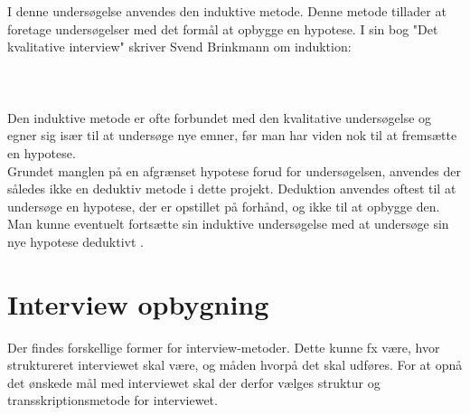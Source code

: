 \\\\ 
I denne undersøgelse anvendes den induktive metode. Denne metode tillader at foretage undersøgelser med det formål at opbygge en hypotese. 
I sin bog "Det kvalitative interview" skriver Svend Brinkmann om induktion:
\\\\
 \citep{brinkmann2014}
\\\\
Den induktive metode er ofte forbundet med den kvalitative undersøgelse og egner sig især til at undersøge nye emner, før man har viden nok til at fremsætte en hypotese. 
\\
Grundet manglen på en afgrænset hypotese forud for undersøgelsen, anvendes der således ikke en deduktiv metode i dette projekt. Deduktion anvendes oftest til at undersøge en hypotese, der er opstillet på forhånd, og ikke til at opbygge den. Man kunne eventuelt fortsætte sin induktive undersøgelse med at undersøge sin nye hypotese deduktivt \cite{deduktiv}.



\section{Interview opbygning}
Der findes forskellige former for interview-metoder. Dette kunne fx være, hvor struktureret interviewet skal være, og måden hvorpå det skal udføres. For at opnå det ønskede mål med interviewet skal der derfor vælges struktur og transskriptionsmetode for interviewet.

